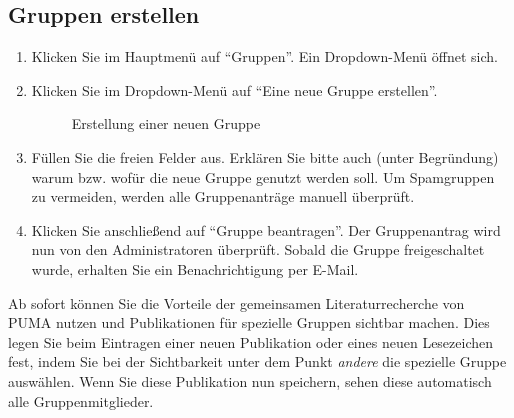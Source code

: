 \subsection{Gruppen erstellen}
\label{subsec:gruppenErstellen}
\begin{enumerate}
    \item Klicken Sie im Hauptmenü auf \enquote{Gruppen}. Ein Dropdown-Menü öffnet sich.
    \item Klicken Sie im Dropdown-Menü auf \enquote{Eine neue Gruppe erstellen}.
\begin{figure}[h!]
 \centering
 \caption{Erstellung einer neuen Gruppe}
 \label{fig:erstellungNeueGruppe}
\end{figure}
    \item Füllen Sie die freien Felder aus. Erklären Sie bitte auch (unter Begründung) warum bzw. wofür die neue Gruppe genutzt werden soll. Um Spamgruppen zu vermeiden, werden alle Gruppenanträge manuell überprüft. 
    \item Klicken Sie anschließend auf \enquote{Gruppe beantragen}. Der Gruppenantrag wird nun von den Administratoren überprüft. Sobald die Gruppe freigeschaltet wurde, erhalten Sie ein Benachrichtigung per E-Mail.
\end{enumerate}
Ab sofort können Sie die Vorteile der gemeinsamen Literaturrecherche von PUMA nutzen und Publikationen  für spezielle Gruppen sichtbar machen. Dies legen Sie beim Eintragen einer neuen Publikation oder eines neuen Lesezeichen fest, indem Sie bei der Sichtbarkeit unter dem Punkt \textit{andere} die spezielle Gruppe auswählen. Wenn Sie diese Publikation nun speichern, sehen diese automatisch alle Gruppenmitglieder.
